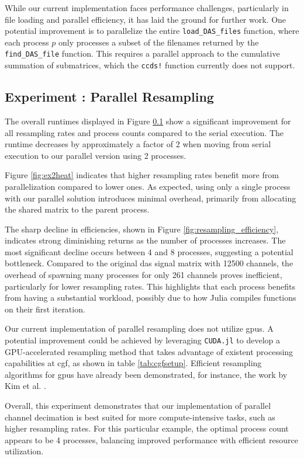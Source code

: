 While our current implementation faces performance challenges, particularly in file loading and parallel efficiency, it has laid the ground for further work. One potential improvement is to parallelize the entire \texttt{load\_DAS\_files} function, where each process $p$ only processes a subset of the filenames returned by the \texttt{find\_DAS\_file} function. This requires a parallel approach to the cumulative summation of submatrices, which the \texttt{ccds!} function currently does not support.

\subsection{Experiment : Parallel Resampling}

\label{fig:resampling-benchmark}
The overall runtimes displayed in Figure \ref{fig:resampling-benchmark} show a significant improvement for all resampling rates and process counts compared to the serial execution. The runtime decreases by approximately a factor of 2 when moving from serial execution to our parallel version using 2 processes.

Figure \ref{fig:ex2heat} indicates that higher resampling rates benefit more from parallelization compared to lower ones. As expected, using only a single process with our parallel solution introduces minimal overhead, primarily from allocating the shared matrix to the parent process.

The sharp decline in efficiencies, shown in Figure \ref{fig:resampling_efficiency}, indicates strong diminishing returns as the number of processes increases. The most significant decline occurs between 4 and 8 processes, suggesting a potential bottleneck. Compared to the original \acrshort{das} signal matrix with 12500 channels, the overhead of spawning many processes for only 261 channels proves inefficient, particularly for lower resampling rates. This highlights that each process benefits from having a substantial workload, possibly due to how Julia compiles functions on their first iteration.

Our current implementation of parallel resampling does not utilize \acrshort{gpu}s. A potential improvement could be achieved by leveraging \texttt{CUDA.jl} to develop a GPU-accelerated resampling method that takes advantage of existent processing capabilities at \acrshort{cgf}, as shown in table \ref{tab:cgfsetup}. Efficient resampling algorithms for \acrshort{gpu}s have already been demonstrated, for instance, the work by Kim et al. \cite{kim2013efficient}.

Overall, this experiment demonstrates that our implementation of parallel channel decimation is best suited for more compute-intensive tasks, such as higher resampling rates. For this particular example, the optimal process count appears to be 4 processes, balancing improved performance with efficient resource utilization.